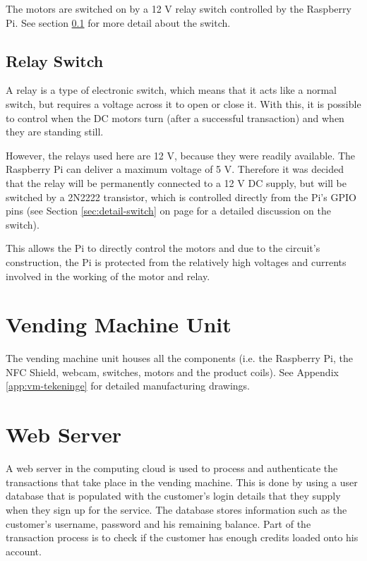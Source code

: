 The motors are switched on by a 12 V relay switch controlled by the Raspberry Pi. See section
\ref{sec:relay-switch} for more detail about the switch.

\subsection{Relay Switch}
\label{sec:relay-switch}

A relay is a type of electronic switch, which means that it acts like a normal switch, but
requires a voltage across it to open or close it. With this, it is possible to control
when the DC motors turn (after a successful transaction) and when they are standing still. 

However, the relays used here are 12 V, because they were readily available. The Raspberry 
Pi can deliver a maximum voltage of 5 V. Therefore it was decided that the relay will be permanently
 connected to a 12 V DC supply, but will be switched by a 2N2222 transistor, which is 
controlled directly from the Pi's  GPIO pins (see Section \ref{sec:detail-switch} on page 
\pageref{sec:detail-switch} for a detailed discussion on the switch).

This allows the Pi to directly control the motors and due to the circuit's construction, the Pi
is protected from the relatively high voltages and currents involved in the working of the
motor and relay.

\section{Vending Machine Unit}

The vending machine unit houses all the components (i.e. the Raspberry Pi, the NFC Shield,
webcam, switches, motors and the product coils). See Appendix \ref{app:vm-tekeninge} 
for detailed manufacturing drawings.

\section{Web Server}

A web server in the computing cloud is used to process and authenticate the
transactions that take place in the vending machine. This is done by
using a user database that is populated with the customer's login details that
they supply when they sign up for the service. The database stores information
such as the customer's username, password and his remaining balance. Part of the
transaction process is to check if the customer has enough credits loaded onto
his account. 

